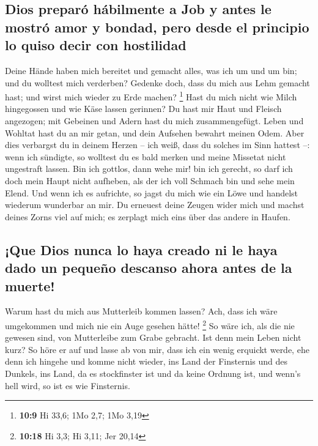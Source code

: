 \hypertarget{dios-preparuxf3-huxe1bilmente-a-job-y-antes-le-mostruxf3-amor-y-bondad-pero-desde-el-principio-lo-quiso-decir-con-hostilidad}{%
\subsection{Dios preparó hábilmente a Job y antes le mostró amor y
bondad, pero desde el principio lo quiso decir con
hostilidad}\label{dios-preparuxf3-huxe1bilmente-a-job-y-antes-le-mostruxf3-amor-y-bondad-pero-desde-el-principio-lo-quiso-decir-con-hostilidad}}

 Deine Hände haben mich bereitet und gemacht alles, was
ich um und um bin; und du wolltest mich verderben? 
Gedenke doch, dass du mich aus Lehm gemacht hast; und wirst mich wieder
zu Erde machen? \footnote{\textbf{10:9} Hi 33,6; 1Mo 2,7; 1Mo 3,19}
 Hast du mich nicht wie Milch hingegossen und wie Käse
lassen gerinnen?  Du hast mir Haut und Fleisch angezogen;
mit Gebeinen und Adern hast du mich zusammengefügt. 
Leben und Wohltat hast du an mir getan, und dein Aufsehen bewahrt meinen
Odem.  Aber dies verbargst du in deinem Herzen -- ich
weiß, dass du solches im Sinn hattest --:  wenn ich
sündigte, so wolltest du es bald merken und meine Missetat nicht
ungestraft lassen.  Bin ich gottlos, dann wehe mir! bin
ich gerecht, so darf ich doch mein Haupt nicht aufheben, als der ich
voll Schmach bin und sehe mein Elend.  Und wenn ich es
aufrichte, so jagst du mich wie ein Löwe und handelst wiederum wunderbar
an mir.  Du erneuest deine Zeugen wider mich und machst
deines Zorns viel auf mich; es zerplagt mich eins über das andere in
Haufen.

\hypertarget{que-dios-nunca-lo-haya-creado-ni-le-haya-dado-un-pequeuxf1o-descanso-ahora-antes-de-la-muerte}{%
\subsection{¡Que Dios nunca lo haya creado ni le haya dado un pequeño
descanso ahora antes de la
muerte!}\label{que-dios-nunca-lo-haya-creado-ni-le-haya-dado-un-pequeuxf1o-descanso-ahora-antes-de-la-muerte}}

 Warum hast du mich aus Mutterleib kommen lassen? Ach,
dass ich wäre umgekommen und mich nie ein Auge gesehen hätte!
\footnote{\textbf{10:18} Hi 3,3; Hi 3,11; Jer 20,14}  So
wäre ich, als die nie gewesen sind, von Mutterleibe zum Grabe gebracht.
 Ist denn mein Leben nicht kurz? So höre er auf und lasse
ab von mir, dass ich ein wenig erquickt werde,  ehe denn
ich hingehe und komme nicht wieder, ins Land der Finsternis und des
Dunkels,  ins Land, da es stockfinster ist und da keine
Ordnung ist, und wenn's hell wird, so ist es wie Finsternis.

